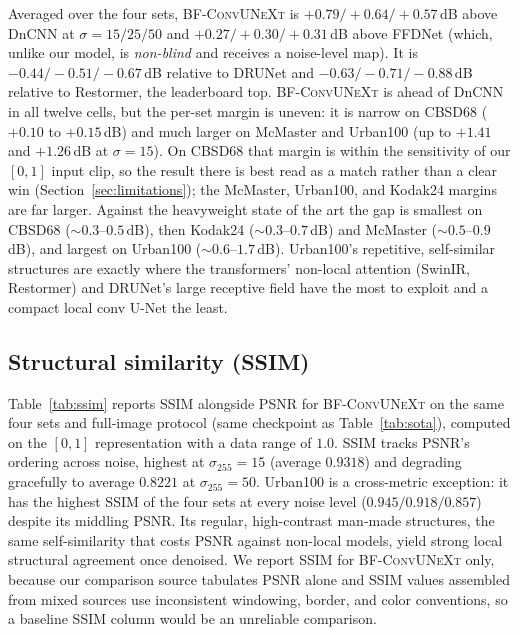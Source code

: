 \documentclass{article}
\newcommand{\model}{\textsc{BF-ConvUNeXt}}
\newcommand{\sigpx}{\sigma_{255}}
\begin{document}
Averaged over the four sets, \model{} is $+0.79/+0.64/+0.57$\,dB above DnCNN at $\sigma=15/25/50$ and $+0.27/+0.30/+0.31$\,dB above FFDNet (which, unlike our model, is \emph{non-blind} and receives a noise-level map). It is $-0.44/-0.51/-0.67$\,dB relative to DRUNet and $-0.63/-0.71/-0.88$\,dB relative to Restormer, the leaderboard top. \model{} is ahead of DnCNN in all twelve cells, but the per-set margin is uneven: it is narrow on CBSD68 ($+0.10$ to $+0.15$\,dB) and much larger on McMaster and Urban100 (up to $+1.41$ and $+1.26$\,dB at $\sigma{=}15$). On CBSD68 that margin is within the sensitivity of our $[0,1]$ input clip, so the result there is best read as a match rather than a clear win (Section~\ref{sec:limitations}); the McMaster, Urban100, and Kodak24 margins are far larger. Against the heavyweight state of the art the gap is smallest on CBSD68 ($\sim0.3$--$0.5$\,dB), then Kodak24 ($\sim0.3$--$0.7$\,dB) and McMaster ($\sim0.5$--$0.9$\,dB), and largest on Urban100 ($\sim0.6$--$1.7$\,dB). Urban100's repetitive, self-similar structures are exactly where the transformers' non-local attention (SwinIR, Restormer) and DRUNet's large receptive field have the most to exploit and a compact local conv U-Net the least.

\subsection{Structural similarity (SSIM)}
\label{sec:ssim}
Table~\ref{tab:ssim} reports SSIM alongside PSNR for \model{} on the same four sets and full-image protocol (same checkpoint as Table~\ref{tab:sota}), computed on the $[0,1]$ representation with a data range of $1.0$. SSIM tracks PSNR's ordering across noise, highest at $\sigpx{=}15$ (average $0.9318$) and degrading gracefully to average $0.8221$ at $\sigpx{=}50$. Urban100 is a cross-metric exception: it has the highest SSIM of the four sets at every noise level ($0.945/0.918/0.857$) despite its middling PSNR. Its regular, high-contrast man-made structures, the same self-similarity that costs PSNR against non-local models, yield strong local structural agreement once denoised. We report SSIM for \model{} only, because our comparison source \citep{zhang2022scunet} tabulates PSNR alone and SSIM values assembled from mixed sources use inconsistent windowing, border, and color conventions, so a baseline SSIM column would be an unreliable comparison.
\end{document}
